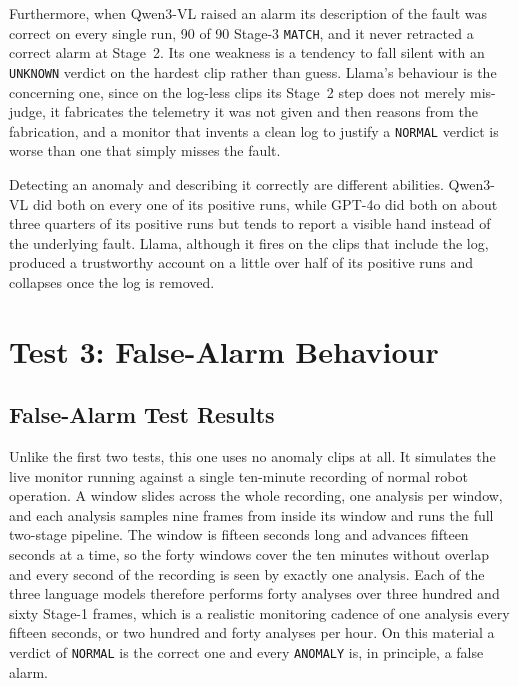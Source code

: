 \documentclass[11pt,a4paper]{article}
\begin{document}
Furthermore, when Qwen3-VL raised an alarm its description of the fault
was correct on every single run, 90 of 90 Stage-3 \texttt{MATCH}, and it
never retracted a correct alarm at Stage~2. Its one weakness is a tendency
to fall silent with an \texttt{UNKNOWN} verdict on the hardest clip rather
than guess. Llama's behaviour is the concerning one, since on the log-less
clips its Stage~2 step does not merely mis-judge, it fabricates the
telemetry it was not given and then reasons from the fabrication, and a
monitor that invents a clean log to justify a \texttt{NORMAL} verdict is
worse than one that simply misses the fault.

Detecting an anomaly and describing it correctly are different abilities.
Qwen3-VL did both on every one of its positive runs, while GPT-4o did both
on about three quarters of its positive runs but tends to report a visible
hand instead of the underlying fault. Llama, although it fires on the
clips that include the log, produced a trustworthy account on a little
over half of its positive runs and collapses once the log is removed.

\section{Test 3: False-Alarm Behaviour}
\label{sec:test3}

\subsection{False-Alarm Test Results}

Unlike the first two tests, this one uses no anomaly clips at all. It
simulates the live monitor running against a single ten-minute recording
of normal robot operation. A window slides across the whole recording, one
analysis per window, and each analysis samples nine frames from inside its
window and runs the full two-stage pipeline. The window is fifteen seconds
long and advances fifteen seconds at a time, so the forty windows cover
the ten minutes without overlap and every second of the recording is seen
by exactly one analysis. Each of the three language models therefore
performs forty analyses over three hundred and sixty Stage-1 frames, which
is a realistic monitoring cadence of one analysis every fifteen seconds,
or two hundred and forty analyses per hour. On this material a verdict of
\texttt{NORMAL} is the correct one and every \texttt{ANOMALY} is, in
principle, a false alarm.
\end{document}
